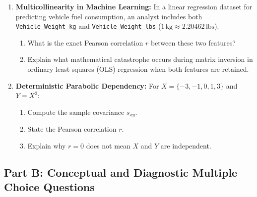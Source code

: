 \begin{enumerate}
    \item \textbf{Multicollinearity in Machine Learning:} In a linear regression dataset for predicting vehicle fuel consumption, an analyst includes both \texttt{Vehicle\_Weight\_kg} and \texttt{Vehicle\_Weight\_lbs} ($1\,\text{kg} \approx 2.20462\,\text{lbs}$).
    \begin{enumerate}
        \item What is the exact Pearson correlation $r$ between these two features?
        \item Explain what mathematical catastrophe occurs during matrix inversion in ordinary least squares (OLS) regression when both features are retained.
    \end{enumerate}

    \item \textbf{Deterministic Parabolic Dependency:} For $X = \{-3, -1, 0, 1, 3\}$ and $Y = X^2$:
    \begin{enumerate}
        \item Compute the sample covariance $s_{xy}$.
        \item State the Pearson correlation $r$.
        \item Explain why $r = 0$ does not mean $X$ and $Y$ are independent.
    \end{enumerate}
\end{enumerate}

\subsection*{Part B: Conceptual and Diagnostic Multiple Choice Questions}

